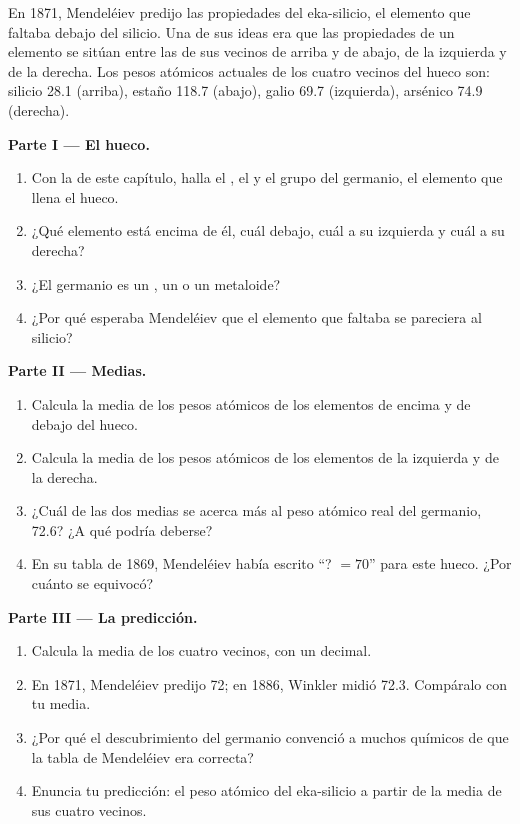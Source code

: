 \begin{problem}
\label{pb:g9:periodic-table-first-look:1}
En 1871, Mendeléiev predijo las propiedades del eka-silicio, el
elemento que faltaba debajo del silicio. Una de sus ideas era que las
propiedades de un elemento se sitúan entre las de sus vecinos de arriba
y de abajo, de la izquierda y de la derecha. Los pesos atómicos actuales
de los cuatro vecinos del hueco son: silicio 28.1 (arriba), estaño 118.7
(abajo), galio 69.7 (izquierda), arsénico 74.9 (derecha).

\medskip
\noindent\textbf{Parte I --- El hueco.}
\begin{enumerate}
  \item Con la  de este capítulo, halla el , el  y el grupo del germanio, el elemento que
        llena el hueco.
  \item ¿Qué elemento está encima de él, cuál debajo, cuál a su
        izquierda y cuál a su derecha?
  \item ¿El germanio es un , un  o un metaloide?
  \item ¿Por qué esperaba Mendeléiev que el elemento que faltaba se
        pareciera al silicio?
\end{enumerate}

\medskip
\noindent\textbf{Parte II --- Medias.}
\begin{enumerate}[resume]
  \item Calcula la media de los pesos atómicos de los elementos de
        encima y de debajo del hueco.
  \item Calcula la media de los pesos atómicos de los elementos de la
        izquierda y de la derecha.
  \item ¿Cuál de las dos medias se acerca más al peso atómico real del
        germanio, 72.6? ¿A qué podría deberse?
  \item En su tabla de 1869, Mendeléiev había escrito ``? $= 70$'' para
        este hueco. ¿Por cuánto se equivocó?
\end{enumerate}

\medskip
\noindent\textbf{Parte III --- La predicción.}
\begin{enumerate}[resume]
  \item Calcula la media de los cuatro vecinos, con un decimal.
  \item En 1871, Mendeléiev predijo 72; en 1886, Winkler midió 72.3.
        Compáralo con tu media.
  \item ¿Por qué el descubrimiento del germanio convenció a muchos
        químicos de que la tabla de Mendeléiev era correcta?
  \item Enuncia tu predicción: el peso atómico del eka-silicio a partir
        de la media de sus cuatro vecinos.
\end{enumerate}
\end{problem}
